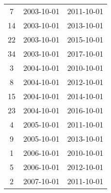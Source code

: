 \begin{tabular}{ccc}
  7 & 2003-10-01 & 2011-10-01 \\ 
  14 & 2003-10-01 & 2013-10-01 \\ 
  22 & 2003-10-01 & 2015-10-01 \\ 
  34 & 2003-10-01 & 2017-10-01 \\ 
  3 & 2004-10-01 & 2010-10-01 \\ 
  8 & 2004-10-01 & 2012-10-01 \\ 
  15 & 2004-10-01 & 2014-10-01 \\ 
  23 & 2004-10-01 & 2016-10-01 \\ 
  4 & 2005-10-01 & 2011-10-01 \\ 
  9 & 2005-10-01 & 2013-10-01 \\ 
  1 & 2006-10-01 & 2010-10-01 \\ 
  5 & 2006-10-01 & 2012-10-01 \\ 
  2 & 2007-10-01 & 2011-10-01 \\ 
   \hline
\end{tabular}
